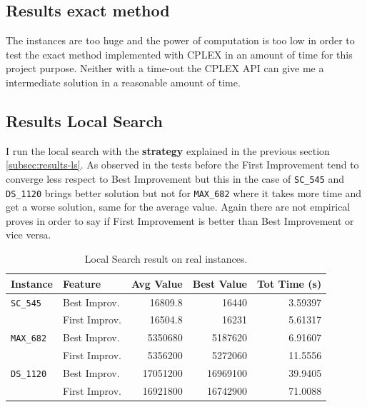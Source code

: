 	
	
	\subsection{Results exact method}
		The instances are too huge and the power of computation is too low in order to test the exact method implemented with CPLEX in an amount of time for this project purpose. Neither with a time-out the CPLEX API can give me a intermediate solution in a reasonable amount of time.
		
	
	\subsection{Results Local Search}
		I run the local search with the \textbf{strategy} explained in the previous section \ref{subsec:results-ls}. As observed in the tests before the First Improvement tend to converge less respect to Best Improvement but this in the case of \verb|SC_545| and \verb|DS_1120| brings better solution but not for \verb|MAX_682| where it takes more time and get a worse solution, same for the average value. Again there are not empirical proves in order to say if First Improvement is better than Best Improvement or vice versa.
		
		\begin{table}[h]
			\centering
			\begin{tabular}{llrrr}
				\toprule
				\textbf{Instance} & \textbf{Feature} & \textbf{Avg Value} & \textbf{Best Value} & \textbf{Tot Time (s)} \\
				\toprule
				\verb|SC_545|  & Best Improv. & 16809.8   & 16440            & 3.59397    \\
				& First Improv. & 16504.8   & 16231            & 5.61317    \\
				\midrule
				\verb|MAX_682| & Best Improv.  & 5350680   & 5187620          & 6.91607    \\
				& First Improv. & 5356200   & 5272060          & 11.5556    \\
				\midrule
				\verb|DS_1120| & Best Improv.  & 17051200   & 16969100         & 39.9405    \\
				& First Improv. & 16921800    & 16742900         & 71.0088   \\
				\bottomrule
			\end{tabular}
		\caption{Local Search result on real instances.}
		\label{fig:ri-results-ls}
		\end{table}
	
